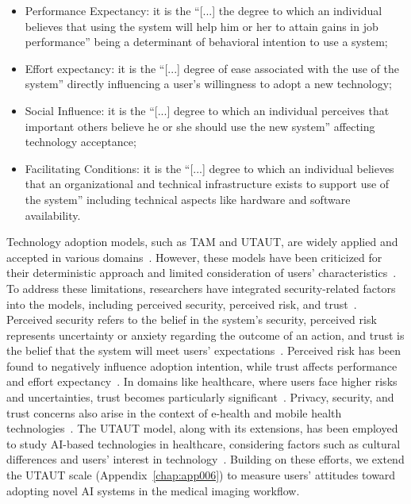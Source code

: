 \begin{itemize}
\item Performance Expectancy: it is the ``[...] the degree to which an individual believes that using the system will help him or her to attain gains in job performance'' being a determinant of behavioral intention to use a system;
\item Effort expectancy: it is the ``[...] degree of ease associated with the use of the system'' directly influencing a user's willingness to adopt a new technology;
\item Social Influence: it is the ``[...] degree to which an individual perceives that important others believe he or she should use the new system'' affecting technology acceptance;
\item Facilitating Conditions: it is the ``[...] degree to which an individual believes that an organizational and technical infrastructure exists to support use of the system'' including technical aspects like hardware and software availability.
\end{itemize}

\vspace{0.05mm}

Technology adoption models, such as \ac{TAM} and \ac{UTAUT}, are widely applied and accepted in various domains~\cite{KHALILZADEH2017460}.
However, these models have been criticized for their deterministic approach and limited consideration of users' characteristics~\cite{CALISTO2022102922}.
To address these limitations, researchers have integrated security-related factors into the models, including perceived security, perceived risk, and trust~\cite{KHALILZADEH2017460}.
Perceived security refers to the belief in the system's security, perceived risk represents uncertainty or anxiety regarding the outcome of an action, and trust is the belief that the system will meet users' expectations~\cite{KHALILZADEH2017460}.
Perceived risk has been found to negatively influence adoption intention, while trust affects performance and effort expectancy~\cite{Lee:2013:0301-2212:587}.
In domains like healthcare, where users face higher risks and uncertainties, trust becomes particularly significant~\cite{CALISTO2022102922}.
Privacy, security, and trust concerns also arise in the context of e-health and mobile health technologies~\cite{10.1145/3132272.3134111}.
The \ac{UTAUT} model, along with its extensions, has been employed to study \ac{AI}-based technologies in healthcare, considering factors such as cultural differences and users' interest in technology~\cite{SOHN2020101324, CALISTO2022102922}.
Building on these efforts, we extend the \ac{UTAUT} scale (Appendix~\ref{chap:app006}) to measure users' attitudes toward adopting novel \ac{AI} systems in the medical imaging workflow.

